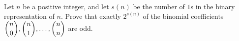 Let $n$ be a positive integer, and let $s(n)$ be the number of $1$s in the binary representation of $n$. Prove that exactly $2^{s(n)}$ of the binomial coefficients $\dbinom n0,\dbinom n1,\dots,\dbinom nn$ are odd.
